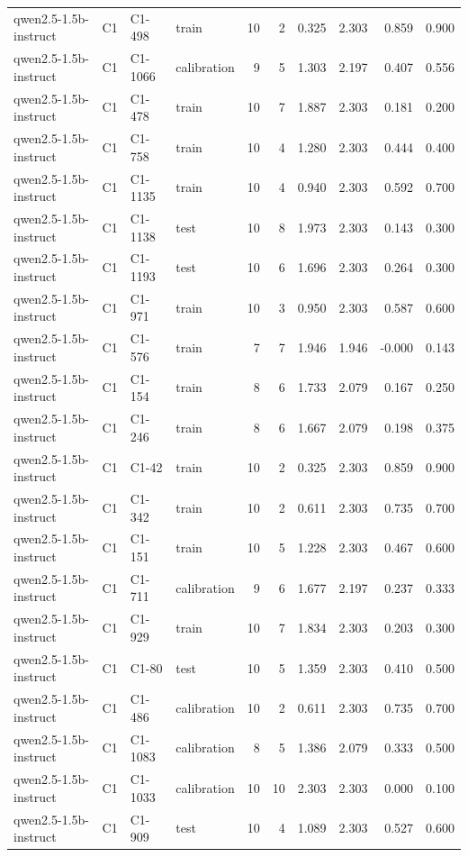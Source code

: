 \begin{table}
\begin{tabular}{llllrrrrrr}
qwen2.5-1.5b-instruct & C1 & C1-498 & train & 10 & 2 & 0.325 & 2.303 & 0.859 & 0.900 \\
qwen2.5-1.5b-instruct & C1 & C1-1066 & calibration & 9 & 5 & 1.303 & 2.197 & 0.407 & 0.556 \\
qwen2.5-1.5b-instruct & C1 & C1-478 & train & 10 & 7 & 1.887 & 2.303 & 0.181 & 0.200 \\
qwen2.5-1.5b-instruct & C1 & C1-758 & train & 10 & 4 & 1.280 & 2.303 & 0.444 & 0.400 \\
qwen2.5-1.5b-instruct & C1 & C1-1135 & train & 10 & 4 & 0.940 & 2.303 & 0.592 & 0.700 \\
qwen2.5-1.5b-instruct & C1 & C1-1138 & test & 10 & 8 & 1.973 & 2.303 & 0.143 & 0.300 \\
qwen2.5-1.5b-instruct & C1 & C1-1193 & test & 10 & 6 & 1.696 & 2.303 & 0.264 & 0.300 \\
qwen2.5-1.5b-instruct & C1 & C1-971 & train & 10 & 3 & 0.950 & 2.303 & 0.587 & 0.600 \\
qwen2.5-1.5b-instruct & C1 & C1-576 & train & 7 & 7 & 1.946 & 1.946 & -0.000 & 0.143 \\
qwen2.5-1.5b-instruct & C1 & C1-154 & train & 8 & 6 & 1.733 & 2.079 & 0.167 & 0.250 \\
qwen2.5-1.5b-instruct & C1 & C1-246 & train & 8 & 6 & 1.667 & 2.079 & 0.198 & 0.375 \\
qwen2.5-1.5b-instruct & C1 & C1-42 & train & 10 & 2 & 0.325 & 2.303 & 0.859 & 0.900 \\
qwen2.5-1.5b-instruct & C1 & C1-342 & train & 10 & 2 & 0.611 & 2.303 & 0.735 & 0.700 \\
qwen2.5-1.5b-instruct & C1 & C1-151 & train & 10 & 5 & 1.228 & 2.303 & 0.467 & 0.600 \\
qwen2.5-1.5b-instruct & C1 & C1-711 & calibration & 9 & 6 & 1.677 & 2.197 & 0.237 & 0.333 \\
qwen2.5-1.5b-instruct & C1 & C1-929 & train & 10 & 7 & 1.834 & 2.303 & 0.203 & 0.300 \\
qwen2.5-1.5b-instruct & C1 & C1-80 & test & 10 & 5 & 1.359 & 2.303 & 0.410 & 0.500 \\
qwen2.5-1.5b-instruct & C1 & C1-486 & calibration & 10 & 2 & 0.611 & 2.303 & 0.735 & 0.700 \\
qwen2.5-1.5b-instruct & C1 & C1-1083 & calibration & 8 & 5 & 1.386 & 2.079 & 0.333 & 0.500 \\
qwen2.5-1.5b-instruct & C1 & C1-1033 & calibration & 10 & 10 & 2.303 & 2.303 & 0.000 & 0.100 \\
qwen2.5-1.5b-instruct & C1 & C1-909 & test & 10 & 4 & 1.089 & 2.303 & 0.527 & 0.600 \\

\end{tabular}
\end{table}
